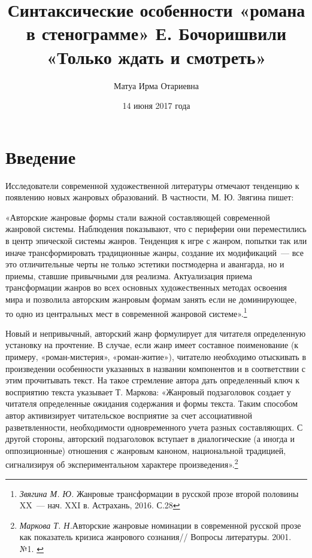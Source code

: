 \documentclass{kursa4}
\title{Синтаксические особенности «романа в стенограмме» Е. Бочоришвили «Только
ждать и смотреть»}
\author{Матуа Ирма Отариевна}
\date{14 июня 2017 года}
\begin{document}
  \thispagestyle{empty}
  \maketitle


  \setcounter{tocdepth}{2}
  \thispagestyle{empty}
  \renewcommand\contentsname{Оглавление}
  \tableofcontents

  \chapter*{Введение}

  \setcounter{page}{3}
  \pagestyle{plain}

    Исследователи современной художественной литературы отмечают
    тенденцию к появлению новых жанровых образований. В частности, М. Ю.
    Звягина пишет:

    «Авторские жанровые формы стали важной составляющей современной
    жанровой системы. Наблюдения показывают, что с периферии они
    переместились в центр эпической системы жанров. Тенденция к игре с
    жанром, попытки так или иначе трансформировать традиционные жанры,
    создание их модификаций~--- все это отличительные черты не только
    эстетики постмодерна и авангарда, но и приемы, ставшие привычными для
    реализма. Актуализация приема трансформации жанров во всех основных
    художественных методах освоения мира и позволила авторским жанровым
    формам занять если не доминирующее, то одно из центральных мест в
    современной жанровой
    системе».\footnote{\textit{Звягина М. Ю.
    }{Жанровые трансформации в русской прозе второй
    половины XX~--- нач. XXI в. Астрахань, 2016. С.28}}

    Новый и непривычный, авторский жанр формулирует для читателя
    определенную установку на прочтение. В случае, если жанр имеет
    составное поименование (к примеру, «роман-мистерия», «роман-житие»),
    читателю необходимо отыскивать в произведении особенности указанных в
    названии компонентов и в соответствии с этим прочитывать текст. На
    такое стремление автора дать определенный ключ к восприятию текста
    указывает Т. Маркова:\newline
    «Жанровый подзаголовок создает у читателя определенные ожидания
    содержания и формы текста. Таким способом автор активизирует
    читательское восприятие за счет ассоциативной разветвленности,
    необходимости одновременного учета разных составляющих. С другой
    стороны, авторский подзаголовок вступает в диалогические (а иногда и
    оппозиционные) отношения с жанровым каноном, национальной традицией,
    сигнализируя об экспериментальном характере
    произведения».\footnote{{
    }\textit{{Маркова Т. Н.}}{Авторские
    жанровые номинации в современной русской прозе как показатель кризиса
    жанрового сознания// Вопросы литературы. 2001. №1. }}
\end{document}
